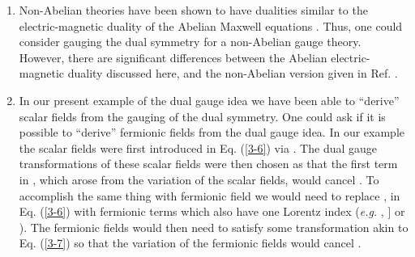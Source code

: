 \documentclass[a4paper,aps]{revtex4}
\begin{document}
\begin{enumerate}


\item{Non-Abelian theories have been shown to have dualities similar
to the electric-magnetic duality of the Abelian Maxwell equations
\cite{tsou}. Thus, one could consider gauging the dual symmetry for
a non-Abelian gauge theory. However, there are significant differences
between the Abelian electric-magnetic duality discussed here,
and the non-Abelian version given in Ref. \cite{tsou}.}

\item{In our present example of the dual gauge idea we have been able
to ``derive'' scalar fields from the gauging of the dual symmetry.
One could ask if it is possible to ``derive'' fermionic fields
from the dual gauge idea. In our example the scalar fields
were first introduced in Eq. (\ref{3-6}) via \coordHE{}. The
dual gauge transformations of these scalar fields were then chosen
as that the first term in \coordHE{}, which arose from the
variation of the scalar fields, would cancel \coordHE{}.
To accomplish the same thing with fermionic field we would need to
replace \myHighlight{$\partial _{\mu} \phi$}\coordHE{}, \myHighlight{$\partial _{\mu} \phi ^{\ast}$}\coordHE{} in Eq.
(\ref{3-6}) with fermionic terms which also have one Lorentz index
({\it e.g.} \myHighlight{$\partial _{\mu} \phi$}\coordHE{}, \myHighlight{$\partial _{\mu} \phi ^{\ast}$}\coordHE{}  \myHighlight{$\rightarrow$}\coordHE{}  \myHighlight{$\partial_{\mu} [{\bar \psi} \psi$}\coordHE{}] or
\myHighlight{${\bar \psi} \gamma _{\mu} \psi$}\coordHE{}). The fermionic fields would then
need to satisfy some transformation akin to Eq. (\ref{3-7}) so that
the variation of the fermionic fields would cancel
\coordHE{}.}

\end{enumerate}
\end{document}
